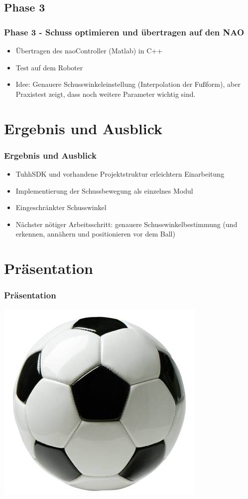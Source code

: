 \documentclass[]{beamer}
\begin{document}
\subsection{Phase 3}
\begin{frame}
	\frametitle{Phase 3 - Schuss optimieren und übertragen auf den NAO}
	\begin{itemize}
		\item Übertragen des naoController (Matlab) in C++
		\item Test auf dem Roboter
		\item Idee: Genauere Schusswinkeleinstellung (Interpolation der Fußform), aber Praxistest zeigt, dass noch weitere Parameter wichtig sind.
	\end{itemize}
\end{frame}

\section{Ergebnis und Ausblick}
\begin{frame}
	\frametitle{Ergebnis und Ausblick}
	\begin{itemize}
		\item TuhhSDK und vorhandene Projektstruktur erleichtern Einarbeitung
		\item Implementierung der Schussbewegung als einzelnes Modul
		\item Eingeschränkter Schusswinkel
		\item Nächster nötiger Arbeitsschritt: genauere Schusswinkelbestimmung (und erkennen, annähern und positionieren vor dem Ball)  
	\end{itemize}
\end{frame}

\section{Präsentation}	
\begin{frame}
	\frametitle{Präsentation}
	\begin{center}
		\includegraphics[scale=0.5]{football}
	\end{center}
\end{frame}
	
\end{document}
